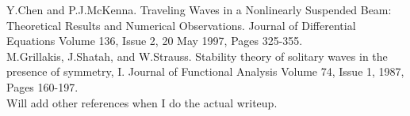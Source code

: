 \documentclass[12pt]{article}
\begin{document}
Y.Chen and P.J.McKenna. Traveling Waves in a Nonlinearly Suspended Beam: Theoretical Results and Numerical Observations. Journal of Differential Equations Volume 136, Issue 2, 20 May 1997, Pages 325-355.\\

M.Grillakis, J.Shatah, and W.Strauss. Stability theory of solitary waves in the presence of symmetry, I. Journal of Functional Analysis Volume 74, Issue 1, 1987, Pages 160-197.\\

Will add other references when I do the actual writeup.
\end{document}
